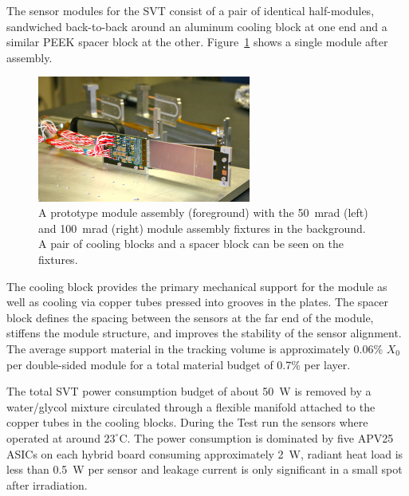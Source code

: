 \documentclass[final,3p,times,twocolumn]{elsarticle}
\begin{document}
The sensor modules for the SVT consist of a pair of identical half-modules, sandwiched back-to-back 
around an aluminum cooling block at one end and a similar PEEK spacer block at the other. 
Figure~\ref{fig:tracker_module} shows a single module after assembly.
\begin{figure}[htp]
	\begin{center}
   	 \includegraphics[width=7cm]{figures/IMG_5200}
	\caption{\small{A prototype module assembly (foreground) with the 50~mrad (left) and 100~mrad (right) module assembly fixtures in the background.  A pair of cooling blocks and a spacer block can be seen on the fixtures.} }
	\label{fig:tracker_module}
	\end{center}
\vspace*{-5mm}
\end{figure}
The cooling block provides the primary mechanical support for the module as well as cooling via copper 
tubes pressed into grooves in the plates. The spacer block defines the spacing between the sensors at 
the far end of the module, stiffens the module structure, and improves the stability of the sensor 
alignment.  The average support material in the tracking volume is approximately 0.06\% $X_{0}$ per 
double-sided module for a total material budget of 0.7\% per layer.

The total SVT power consumption budget of about 50~W is removed by a water/glycol mixture 
circulated through a flexible manifold attached to the copper tubes in the cooling blocks. During the Test 
run the sensors where operated at around $23^{\circ}$C. The power consumption is dominated by five 
APV25 ASICs on each hybrid board consuming approximately 2~W, radiant heat load is less than 
0.5~W per sensor and leakage current is only significant in a small spot after irradiation.  
\end{document}
